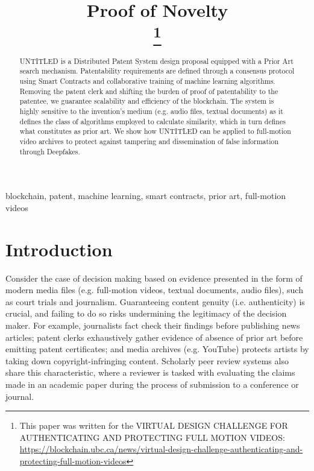 \documentclass[conference]{IEEEtran}
\begin{document}
\title{Proof of Novelty\\
\thanks{This paper was written for the VIRTUAL DESIGN CHALLENGE FOR AUTHENTICATING AND PROTECTING FULL MOTION VIDEOS: \url{https://blockchain.ubc.ca/news/virtual-design-challenge-authenticating-and-protecting-full-motion-videos}}
}

\author{
}

\maketitle

\begin{abstract}
UNTITLED is a Distributed Patent System design proposal equipped with a Prior Art search mechanism. Patentability requirements are defined through a consensus protocol using Smart Contracts and collaborative training of machine learning algorithms. Removing the patent clerk and shifting the burden of proof of patentability to the patentee, we guarantee scalability and efficiency of the blockchain. The system is highly sensitive to the invention’s medium (e.g. audio files, textual documents) as it defines the class of algorithms employed to calculate similarity, which in turn defines what constitutes as prior art. We show how UNTITLED can be applied to full-motion video archives to protect against tampering and dissemination of false information through Deepfakes.\end{abstract}

\begin{IEEEkeywords}
blockchain, patent, machine learning, smart contracts, prior art, full-motion videos
\end{IEEEkeywords}

\section{Introduction}

Consider the case of decision making based on evidence presented in the form of modern media files (e.g. full-motion videos, textual documents, audio files), such as court trials and journalism. Guaranteeing content genuity (i.e. authenticity) is crucial, and failing to do so risks undermining the legitimacy of the decision maker. For example, journalists fact check their findings before publishing news articles; patent clerks exhaustively gather evidence of absence of prior art before emitting patent certificates; and media archives (e.g. YouTube) protects artists by taking down copyright-infringing content. Scholarly peer review systems also share this characteristic, where a reviewer is tasked with evaluating the claims made in an academic paper during the process of submission to a conference or journal. 
\end{document}
